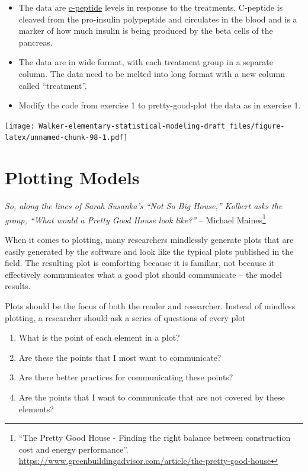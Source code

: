\documentclass[]{book}
\providecommand{\tightlist}{%
  \setlength{\itemsep}{0pt}\setlength{\parskip}{0pt}}
\let\rmarkdownfootnote\footnote%
\def\footnote{\protect\rmarkdownfootnote}
\begin{document}
\begin{itemize}
\tightlist
\item
  The data are \href{https://en.wikipedia.org/wiki/C-peptide}{c-peptide} levels in response to the treatments. C-peptide is cleaved from the pro-insulin polypeptide and circulates in the blood and is a marker of how much insulin is being produced by the beta cells of the pancreas.
\item
  The data are in wide format, with each treatment group in a separate column. The data need to be melted into long format with a new column called ``treatment''.
\item
  Modify the code from exercise 1 to pretty-good-plot the data as in exercise 1.
\end{itemize}

\texttt{[image: Walker-elementary-statistical-modeling-draft\_files/figure-latex/unnamed-chunk-98-1.pdf]}

\hypertarget{plotting-models}{%
\chapter{Plotting Models}\label{plotting-models}}

\emph{So, along the lines of Sarah Susanka's ``Not So Big House,'' Kolbert asks the group, ``What would a Pretty Good House look like?''} -- Michael Maines\footnote{``The Pretty Good House - Finding the right balance between construction cost and energy performance''. \url{https://www.greenbuildingadvisor.com/article/the-pretty-good-house}}

When it comes to plotting, many researchers mindlessly generate plots that are easily generated by the software and look like the typical plots published in the field. The resulting plot is comforting because it is familiar, not because it effectively communicates what a good plot should communicate -- the model results.

Plots should be the focus of both the reader and researcher. Instead of mindless plotting, a researcher should ask a series of questions of every plot

\begin{enumerate}
\def\labelenumi{\arabic{enumi}.}
\tightlist
\item
  What is the point of each element in a plot?
\item
  Are these the points that I most want to communicate?
\item
  Are there better practices for communicating these points?
\item
  Are the points that I want to communicate that are not covered by these elements?
\end{enumerate}
\end{document}
